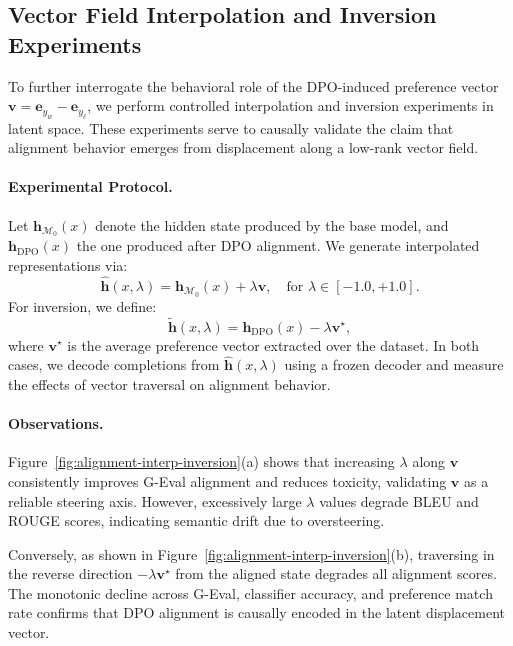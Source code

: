 \subsection{Vector Field Interpolation and Inversion Experiments}
\label{sec:interpolation-inversion}

To further interrogate the behavioral role of the DPO-induced preference vector \( \mathbf{v} = \mathbf{e}_{y_w} - \mathbf{e}_{y_\ell} \), we perform controlled interpolation and inversion experiments in latent space. These experiments serve to causally validate the claim that alignment behavior emerges from displacement along a low-rank vector field.

\paragraph{Experimental Protocol.}
Let \( \mathbf{h}_{\mathcal{M}_0}(x) \) denote the hidden state produced by the base model, and \( \mathbf{h}_{\text{DPO}}(x) \) the one produced after DPO alignment. We generate interpolated representations via:
\[
\hat{\mathbf{h}}(x, \lambda) = \mathbf{h}_{\mathcal{M}_0}(x) + \lambda \mathbf{v}, \quad \text{for } \lambda \in [-1.0, +1.0].
\]
For inversion, we define:
\[
\tilde{\mathbf{h}}(x, \lambda) = \mathbf{h}_{\text{DPO}}(x) - \lambda \mathbf{v}^\star,
\]
where \( \mathbf{v}^\star \) is the average preference vector extracted over the dataset. In both cases, we decode completions from \( \hat{\mathbf{h}}(x, \lambda) \) using a frozen decoder and measure the effects of vector traversal on alignment behavior.

\paragraph{Observations.}
Figure~\ref{fig:alignment-interp-inversion}(a) shows that increasing \( \lambda \) along \( \mathbf{v} \) consistently improves G-Eval alignment and reduces toxicity, validating \( \mathbf{v} \) as a reliable steering axis. However, excessively large \( \lambda \) values degrade BLEU and ROUGE scores, indicating semantic drift due to oversteering.

Conversely, as shown in Figure~\ref{fig:alignment-interp-inversion}(b), traversing in the reverse direction \( -\lambda \mathbf{v}^\star \) from the aligned state degrades all alignment scores. The monotonic decline across G-Eval, classifier accuracy, and preference match rate confirms that DPO alignment is causally encoded in the latent displacement vector.

